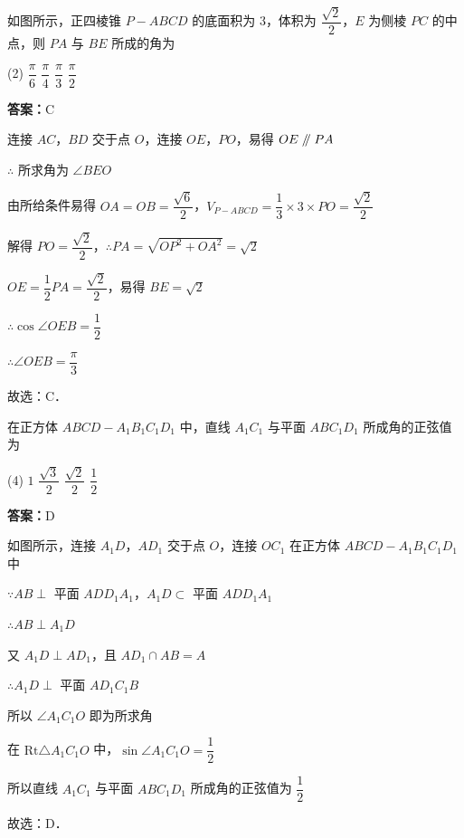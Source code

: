 \vspace{2em}

\begin{example}[\bkstar{3}{5}]
如图所示，正四棱锥 $P-ABCD$ 的底面积为 $3$，体积为 $\dfrac{\sqrt{2}}{2}$，$E$ 为侧棱 $PC$ 的中点，则 $PA$ 与 $BE$ 所成的角为
\begin{tasks}(2)
    \task $\dfrac{\pi}{6}$
    \task $\dfrac{\pi}{4}$
    \task $\dfrac{\pi}{3}$
    \task $\dfrac{\pi}{2}$
\end{tasks}
\end{example}
\begin{solution}
\textbf{答案：}C

连接 $AC$，$BD$ 交于点 $O$，连接 $OE$，$PO$，易得 $OE\mathrel{/\mkern-5mu/} PA$

$\therefore$ 所求角为 $\angle BEO$

由所给条件易得 $OA=OB=\dfrac{\sqrt{6}}{2}$，$V_{P-ABCD}=\dfrac{1}{3}\times 3\times PO=\dfrac{\sqrt{2}}{2}$

解得 $PO=\dfrac{\sqrt{2}}{2}$，$\therefore PA=\sqrt{OP^2+OA^2}=\sqrt{2}$

$OE=\dfrac{1}{2}PA=\dfrac{\sqrt{2}}{2}$，易得 $BE=\sqrt{2}$

$\therefore \cos\angle OEB=\dfrac{1}{2}$

$\therefore \angle OEB=\dfrac{\pi}{3}$

故选：C．
\end{solution}

\vspace{2em}


\begin{example}[\bkstar{3}{5}]
在正方体 $ABCD-A_1B_1C_1D_1$ 中，直线 $A_1C_1$ 与平面 $ABC_1D_1$ 所成角的正弦值为
\begin{tasks}(4)
    \task $1$
    \task $\dfrac{\sqrt{3}}{2}$
    \task $\dfrac{\sqrt{2}}{2}$
    \task $\dfrac{1}{2}$
\end{tasks}
\end{example}
\begin{solution}
\textbf{答案：}D

如图所示，连接 $A_1D$，$AD_1$ 交于点 $O$，连接 $OC_1$
在正方体 $ABCD-A_1B_1C_1D_1$ 中

$\because AB\perp$ 平面 $ADD_1A_1$，$A_1D\subset$ 平面 $ADD_1A_1$

$\therefore AB\perp A_1D$

又 $A_1D\perp AD_1$，且 $AD_1\cap AB=A$

$\therefore A_1D\perp$ 平面 $AD_1C_1B$

所以 $\angle A_1C_1O$ 即为所求角

在 $\mathrm{Rt}\triangle A_1C_1O$ 中，$\sin\angle A_1C_1O=\dfrac{1}{2}$

所以直线 $A_1C_1$ 与平面 $ABC_1D_1$ 所成角的正弦值为 $\dfrac{1}{2}$

故选：D．
\end{solution}

